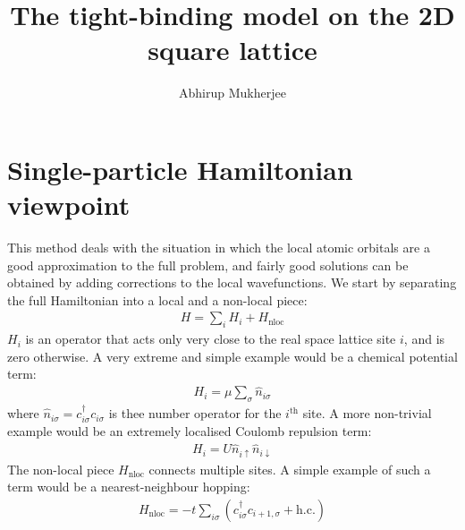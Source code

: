 \documentclass{article}
\begin{document}
\title{\bf The tight-binding model on the 2D square lattice}
\author{Abhirup Mukherjee}
\maketitle
{}

\section{Single-particle Hamiltonian viewpoint}
This method deals with the situation in which the local atomic orbitals are a good approximation to the full problem, and fairly good solutions can be obtained by adding corrections to the local wavefunctions. We start by separating the full Hamiltonian into a local and a non-local piece:
\begin{equation}\begin{aligned}
	H = \sum_i H_i + H_\text{nloc}
\end{aligned}\end{equation}
$H_i$ is an operator that acts only very close to the real space lattice site \(i\), and is zero otherwise. A very extreme and simple example would be a chemical potential term:
\begin{equation}\begin{aligned}
	H_i = \mu \sum_{\sigma} \hat n_{i\sigma}
\end{aligned}\end{equation}
where \(\hat n_{i\sigma} = c^\dagger_{i \sigma}c_{i \sigma}\) is thee number operator for the $i^\text{th}$ site.
A more non-trivial example would be an extremely localised Coulomb repulsion term:
\begin{equation}\begin{aligned}
	H_i =  U\hat n_{i \uparrow}\hat n_{i \downarrow}
\end{aligned}\end{equation}
The non-local piece $H_\text{nloc}$ connects multiple sites. A simple example of such a term would be a nearest-neighbour hopping:
\begin{equation}\begin{aligned}
	H_\text{nloc} =  -t\sum_{i\sigma} \left(c^\dagger_{i\sigma}c_{i+1,\sigma} + \text{h.c.}\right)
\end{aligned}\end{equation}
\end{document}
